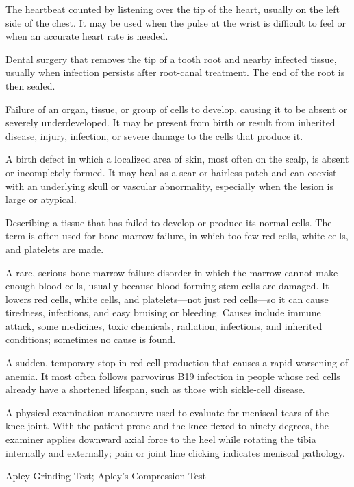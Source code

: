  The heartbeat counted by listening over the tip of the heart, usually on the left side of the chest. It may be used when the pulse at the wrist is difficult to feel or when an accurate heart rate is needed.

 Dental surgery that removes the tip of a tooth root and nearby infected tissue, usually when infection persists after root-canal treatment. The end of the root is then sealed.

 Failure of an organ, tissue, or group of cells to develop, causing it to be absent or severely underdeveloped. It may be present from birth or result from inherited disease, injury, infection, or severe damage to the cells that produce it.

 A birth defect in which a localized area of skin, most often on the scalp, is absent or incompletely formed. It may heal as a scar or hairless patch and can coexist with an underlying skull or vascular abnormality, especially when the lesion is large or atypical.

 Describing a tissue that has failed to develop or produce its normal cells. The term is often used for bone-marrow failure, in which too few red cells, white cells, and platelets are made.

 A rare, serious bone-marrow failure disorder in which the marrow cannot make enough blood cells, usually because blood-forming stem cells are damaged. It lowers red cells, white cells, and platelets—not just red cells—so it can cause tiredness, infections, and easy bruising or bleeding. Causes include immune attack, some medicines, toxic chemicals, radiation, infections, and inherited conditions; sometimes no cause is found.

 A sudden, temporary stop in red-cell production that causes a rapid worsening of anemia. It most often follows parvovirus B19 infection in people whose red cells already have a shortened lifespan, such as those with sickle-cell disease.

 A physical examination manoeuvre used to evaluate for meniscal tears of the knee joint. With the patient prone and the knee flexed to ninety degrees, the examiner applies downward axial force to the heel while rotating the tibia internally and externally; pain or joint line clicking indicates meniscal pathology.

\synonyms
Apley Grinding Test; Apley's Compression Test

